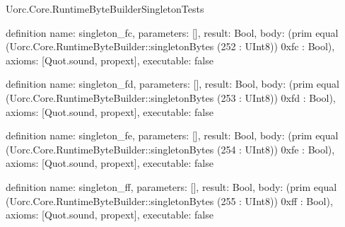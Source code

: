 \begin{lexlean}{Uorc.Core.RuntimeByteBuilderSingletonTests}
\begin{semanticmodule}
definition{
  name: singleton_fc,
  parameters: [],
  result: Bool,
  body: (prim equal (Uorc.Core.RuntimeByteBuilder::singletonBytes (252 : UInt8)) 0xfc : Bool),
  axioms: [Quot.sound, propext],
  executable: false
}

definition{
  name: singleton_fd,
  parameters: [],
  result: Bool,
  body: (prim equal (Uorc.Core.RuntimeByteBuilder::singletonBytes (253 : UInt8)) 0xfd : Bool),
  axioms: [Quot.sound, propext],
  executable: false
}

definition{
  name: singleton_fe,
  parameters: [],
  result: Bool,
  body: (prim equal (Uorc.Core.RuntimeByteBuilder::singletonBytes (254 : UInt8)) 0xfe : Bool),
  axioms: [Quot.sound, propext],
  executable: false
}

definition{
  name: singleton_ff,
  parameters: [],
  result: Bool,
  body: (prim equal (Uorc.Core.RuntimeByteBuilder::singletonBytes (255 : UInt8)) 0xff : Bool),
  axioms: [Quot.sound, propext],
  executable: false
}


\end{semanticmodule}
\end{lexlean}
